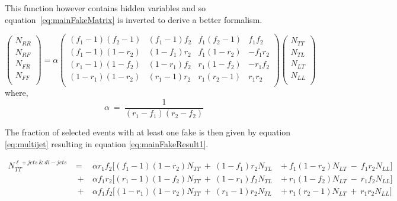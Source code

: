 This function however contains hidden variables and so equation~\ref{eq:mainFakeMatrix} is inverted to derive a better formalism.

\begin{equation}
   \begin{pmatrix}
      N_{RR} \\
      N_{RF} \\
      N_{FR} \\
      N_{FF} \\
   \end{pmatrix}
   = \alpha
   \begin{pmatrix}
      (f_{1}-1)(f_{2}-1) & (f_{1}-1)f_{2} & f_{1}(f_{2}-1) & f_{1}f_{2} \\
      (f_{1}-1)(1-r_{2}) & (1-f_{1})r_{2} & f_{1}(1-r_{2}) & -f_{1}r_{2} \\
      (r_{1}-1)(1-f_{2}) & (1-r_{1})f_{2} & r_{1}(1-f_{2}) & -r_{1}f_{2} \\
      (1-r_{1})(1-r_{2}) & (r_{1}-1)r_{2} & r_{1}(r_{2}-1) & r_{1}r_{2} \\
   \end{pmatrix}
   \begin{pmatrix}
      N_{TT} \\
      N_{TL} \\
      N_{LT} \\
      N_{LL} \\
   \end{pmatrix}
\end{equation}
where,
\begin{equation}
   \alpha~=~\frac{1}{(r_{1}-f_{1})(r_{2}-f_{2})}
\end{equation}

The fraction of selected events with at least one fake is then given by equation \ref{eq:multijet} resulting in equation \ref{eq:mainFakeResult1}.

\begin{equation} \label{eq:mainFakeResult1}
\begin{aligned}
   N^{\ell+jets~\&~di-jets}_{TT}~&=&~\alpha r_{1}f_{2}[(f_{1}-1)(1-r_{2})N_{TT}~+~(1-f_{1})r_{2}N_{TL}~&+~f_{1}(1-r_{2})N_{LT}~-~f_{1}r_{2}N_{LL}] \\
      &~+&~\alpha f_{1}r_{2}[(r_{1}-1)(1-f_{2})N_{TT}~+~(1-r_{1})f_{2}N_{TL}~&+~r_{1}(1-f_{2})N_{LT}~-~r_{1}f_{2}N_{LL}] \\
      &~+&~\alpha f_{1}f_{2}[(1-r_{1})(1-r_{2})N_{TT}~+~(r_{1}-1)r_{2}N_{TL}~&+~r_{1}(r_{2}-1)N_{LT}~+~r_{1}r_{2}N_{LL}] 
\end{aligned}
\end{equation}

